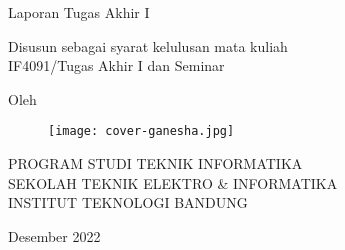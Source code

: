 \clearpage
\pagestyle{empty}

\begin{center}
    \smallskip

    \Large \bfseries \MakeUppercase{\thetitle}
    \vfill

    \Large Laporan Tugas Akhir I
    \vfill

    \large Disusun sebagai syarat kelulusan mata kuliah \\
    IF4091/Tugas Akhir I dan Seminar
    \vfill

    \large Oleh

    \Large \theauthor

    \vfill
    \begin{figure}[h]
        \centering
        \texttt{[image: cover-ganesha.jpg]}
    \end{figure}
    \vfill

    \large
    \uppercase{
        Program Studi Teknik Informatika \\
        Sekolah Teknik Elektro \& Informatika \\
        Institut Teknologi Bandung
    }

    Desember 2022

\end{center}

\clearpage
